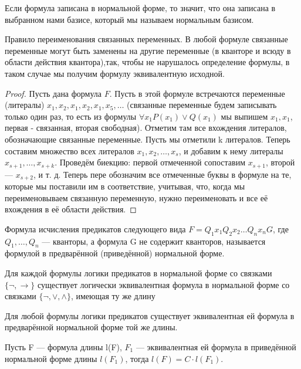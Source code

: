 Если формула записана в нормальной форме, то значит, что она записана в
выбранном нами базисе, который мы называем нормальным базисом.

\begin{theorem}
	Правило переименования связанных переменных. В любой формуле связанные
	переменные могут быть заменены на другие переменные (в кванторе и всюду
	в области действия квантора),так, чтобы не нарушалось определение
	формулы, в таком случае мы получим формулу эквивалентную исходной.
\end{theorem}
\begin{proof}
	Пусть дана формула $F$. Пусть в этой формуле встречаются переменные
	(литералы) $x_1, x_2, x_1, x_2, x_1, x_5, \ldots$ (связанные переменные
	будем записывать только один раз, то есть из формулы $\forall x_1 P(x_1)
	\lor Q(x_1)$ мы выпишем $x_1, x_1$, первая - связанная, вторая свободная). Отметим там 
	все вхождения литералов, обозначающие связанные переменные. Пусть мы
	отметили k литералов. Теперь составим множество всех литералов $x_1,
	x_2, \ldots, x_s$, и добавим к нему литералы $x_{s+1}, \ldots, x_{s+k}$.
	Проведём биекцию: первой отмеченной сопоставим $x_{s+1}$, второй ---
	$x_{s+2}$, и т. д. Теперь пере обозначим все отмеченные буквы в формуле
	на те, которые мы поставили им в соответствие, учитывая, что, когда мы
	переименовываем связанную переменную, нужно переименовать и все её
	вхождения в её области действия.
\end{proof}

\begin{definition}
	Формула исчисления предикатов следующего вида
	$F=Q_1x_1Q_2x_2\ldots Q_nx_n G$, где $Q_1, \ldots, Q_n$ --- кванторы, а
	формула G не содержит кванторов, называется формулой в предварённой
	(приведённой) нормальной форме.
\end{definition}

\begin{theorem}
	Для каждой формулы логики предикатов в нормальной форме со связками
	$\{\lnot, \to\}$ существует логически эквивалентная формула в нормальной
	форме со связками $\{\lnot, \lor, \land\}$, имеющая ту же длину
\end{theorem}

\begin{theorem}
	Для любой формулы логики предикатов существует эквивалентная ей формула
	в предварённой нормальной форме той же длины.
\end{theorem}

\begin{theorem}
	Пусть F --- формула длины l(F), $F_1$ --- эквивалентная ей формула в
	приведённой нормальной форме длины $l(F_1)$, тогда $l(F) = C \cdot
	l(F_1)$.
\end{theorem}

